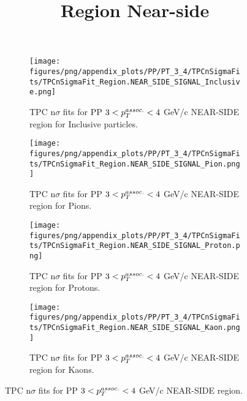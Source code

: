             \begin{figure}[H]
                \title{Region Near-side}
                \begin{subfigure}[b]{0.5\textwidth}
                    \centering
                    \texttt{[image: figures/png/appendix\_plots/PP/PT\_3\_4/TPCnSigmaFits/TPCnSigmaFit\_Region.NEAR\_SIDE\_SIGNAL\_Inclusive.png]}
                    \caption{TPC n$\sigma$ fits for PP $3 < \pTassoc < 4$ GeV/c NEAR-SIDE region for Inclusive particles.}
                    \label{fig:appendix_PP_$3 < \pTassoc < 4$ GeV/c_NEAR_SIDE_SIGNAL_Inclusive}
                \end{subfigure}
                \begin{subfigure}[b]{0.5\textwidth}
                    \centering
                    \texttt{[image: figures/png/appendix\_plots/PP/PT\_3\_4/TPCnSigmaFits/TPCnSigmaFit\_Region.NEAR\_SIDE\_SIGNAL\_Pion.png]}
                    \caption{TPC n$\sigma$ fits for PP $3 < \pTassoc < 4$ GeV/c NEAR-SIDE region for Pions.}
                    \label{fig:appendix_PP_$3 < \pTassoc < 4$ GeV/c_NEAR_SIDE_SIGNAL_Pion}
                \end{subfigure}
                \begin{subfigure}[b]{0.5\textwidth}
                    \centering
                    \texttt{[image: figures/png/appendix\_plots/PP/PT\_3\_4/TPCnSigmaFits/TPCnSigmaFit\_Region.NEAR\_SIDE\_SIGNAL\_Proton.png]}
                    \caption{TPC n$\sigma$ fits for PP $3 < \pTassoc < 4$ GeV/c NEAR-SIDE region for Protons.}
                    \label{fig:appendix_PP_$3 < \pTassoc < 4$ GeV/c_NEAR_SIDE_SIGNAL_Proton}
                \end{subfigure}
                \begin{subfigure}[b]{0.5\textwidth}
                    \centering
                    \texttt{[image: figures/png/appendix\_plots/PP/PT\_3\_4/TPCnSigmaFits/TPCnSigmaFit\_Region.NEAR\_SIDE\_SIGNAL\_Kaon.png]}
                    \caption{TPC n$\sigma$ fits for PP $3 < \pTassoc < 4$ GeV/c NEAR-SIDE region for Kaons.}
                    \label{fig:appendix_PP_$3 < \pTassoc < 4$ GeV/c_NEAR_SIDE_SIGNAL_Kaon}
                \end{subfigure}
                \caption{TPC n$\sigma$ fits for PP $3 < \pTassoc < 4$ GeV/c NEAR-SIDE region.}
                \label{fig:appendix_PP_$3 < \pTassoc < 4$ GeV/c_NEAR_SIDE_SIGNAL}
            \end{figure}
